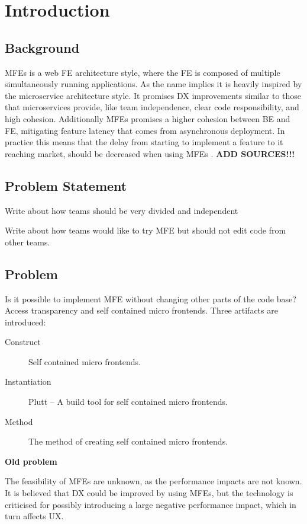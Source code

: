 
\chapter{Introduction}

\section{Background}
\acp{MFE} is a web \ac{FE} architecture style, where the \ac{FE} is composed of multiple simultaneously running applications. As the name implies it is heavily inspired by the microservice architecture style. It promises \ac{DX} improvements similar to those that microservices provide, like team independence, clear code responsibility, and high cohesion. Additionally \acp{MFE} promises a higher cohesion between \ac{BE} and \ac{FE}, mitigating feature latency that comes from asynchronous deployment. In practice this means that the delay from starting to implement a feature to it reaching market, should be decreased when using \acp{MFE} \cite{Celik}. \textbf{ADD SOURCES!!!}


\section{Problem Statement}

Write about how teams should be very divided and independent

Write about how teams would like to try \ac{MFE} but should not edit code from other teams.

\section{Problem}

Is it possible to implement \ac{MFE} without changing other parts of the code base? Access transparency and self contained micro frontends. Three artifacts are introduced:

\begin{description}
\item[Construct] Self contained micro frontends.
\item[Instantiation] Plutt -- A build tool for self contained micro frontends.
\item[Method] The method of creating self contained micro frontends.
\end{description}


\textbf{Old problem}

The feasibility of \acp{MFE} are unknown, as the performance impacts are not known. It is believed that \ac{DX} could be improved by using \acp{MFE}, but the technology is criticised for possibly introducing a large negative performance impact, which in turn affects \ac{UX}.


